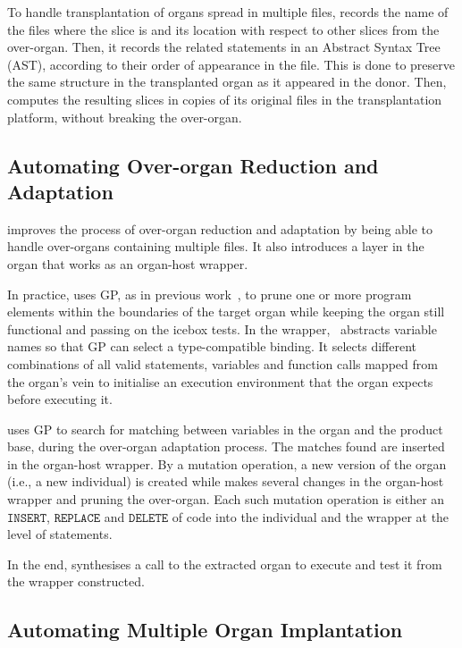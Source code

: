 To handle transplantation of organs spread in multiple files, \prodscalpel records the name of the files where the slice is and its location with respect to other slices from the over-organ. 
Then, it records the related statements in an Abstract Syntax Tree (AST), according to their order of appearance in the file. 
This is done to preserve the same structure in the transplanted organ as it appeared in the donor.
Then, \prodscalpel computes the resulting slices in copies of its original files  in the transplantation platform, without breaking the over-organ.


\subsection{Automating Over-organ Reduction and Adaptation}\label{sec:organ_reduction}
\prodscalpel improves the process of over-organ reduction and adaptation by being able to handle over-organs containing multiple files.
It also introduces a layer in the organ that works as an organ-host wrapper. 

In practice, \prodscalpel uses GP, as in previous work~\cite{Barr2015}, to prune one or more program elements within the boundaries of the target organ while keeping the organ still functional and passing on the icebox tests. 
In the wrapper, \prodscalpel~abstracts variable names so that GP can select a type-compatible binding. It selects different combinations of all valid statements, variables and function calls mapped from the organ's vein to initialise an execution environment that the organ expects before executing it. 

\prodscalpel uses GP to search for matching between variables in the organ and the product base, during the over-organ adaptation process. The matches found are inserted in the organ-host wrapper. 
By a mutation operation, a new version of the organ (i.e., a new individual) is created while \prodscalpel makes several changes in the organ-host wrapper and pruning the over-organ. Each such mutation operation is either an $\texttt{INSERT}$, $\texttt{REPLACE}$ and $\texttt{DELETE}$ of code into the individual and the wrapper at the level of statements.

In the end, \prodscalpel synthesises a call to the extracted organ to execute and test it from the wrapper constructed.

\subsection{Automating Multiple Organ Implantation}
\label{sec:Implantation}


